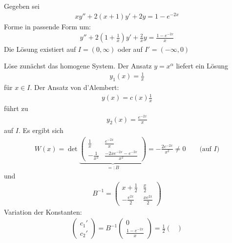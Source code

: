 \begin{example} \label{4.7}
  Gegeben sei
  \begin{align*}
    xy'' + 2(x+1)y' + 2y = 1 - e^{-2x}
  \end{align*}
  Forme in passende Form um:
  \begin{align*}
    y'' + 2(1+\tfrac 1x) y' + \frac 2x y = \frac {1-e^{-2x}}x
  \end{align*}
  Die Lösung existiert auf $I = (0,\infty)$ oder auf $I' = (-\infty,0)$
  \begin{enum-arab}
  \item
    Löse zunächst das homogene System.
    Der Ansatz $y = x^{\alpha}$ liefert ein Lösung
    \begin{align*}
      y_1(x) = \frac 1 x
    \end{align*}
    für $x \in I$.
    Der Ansatz von d'Alembert:
    \begin{align*}
      y(x) = c(x) \frac 1x
    \end{align*}
    führt zu
    \begin{align*}
      y_2(x) = \frac {e^{-2x}}x
    \end{align*}
    auf $I$.
    Es ergibt sich
    \begin{align*}
      W(x) = \det \underbrace{\begin{pmatrix}
          \frac 1x & \frac {e^{-2x}}{x} \\
          - \frac 1{x^2} & \frac {-2xe^{-2x}-e^{-2x}}{x^2}
        \end{pmatrix}}_{=:B} = - \frac {2e^{-2x}}{x^2} \neq 0 \qquad \text{(auf $I$)}
    \end{align*}
    und
    \begin{align*}
      B^{-1} = \begin{pmatrix}
        x+\frac 12 & \frac x2 \\
        -\frac {e^{2x}}{2} & \frac {xe^{2x}}2
      \end{pmatrix}
    \end{align*}
    Variation der Konstanten:
    \begin{align*}
      \begin{pmatrix}
        c_1' \\ c_2'
      \end{pmatrix} = B^{-1} \begin{pmatrix}
        0 \\ \frac {1-e^{-2x}}x
      \end{pmatrix} = \frac 12 \begin{pmatrix}

\end{pmatrix}
\end{align*}
\end{enum-arab}
\end{example}
